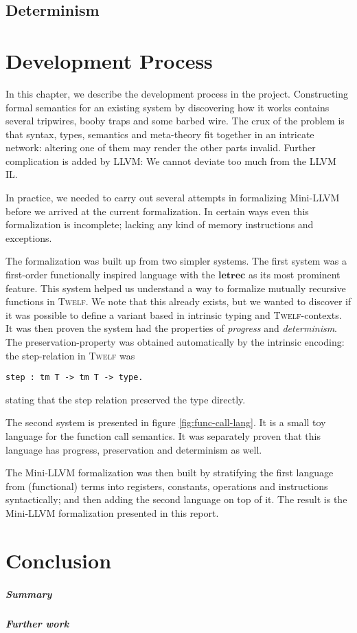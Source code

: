\documentclass[a4paper, oneside, 10pt, draft]{memoir}
\newcommand{\twelf}{\textsc{Twelf}}
\begin{document}
\section{Determinism}
\chapter{Development Process}

In this chapter, we describe the development process in the
project. Constructing formal semantics for an existing system by
discovering how it works contains several tripwires, booby traps and
some barbed wire. The crux of the problem is that syntax, types,
semantics and meta-theory fit together in an intricate network:
altering one of them may render the other parts invalid. Further
complication is added by LLVM: We cannot deviate too much from the
LLVM IL.

In practice, we needed to carry out several attempts in formalizing
Mini-LLVM before we arrived at the current formalization. In certain
ways even this formalization is incomplete; lacking any kind of memory
instructions and exceptions.

The formalization was built up from two simpler systems. The first
system was a first-order functionally inspired language with the
$\mathbf{letrec}$ as its most prominent feature. This system helped us
understand a way to formalize mutually recursive functions in
\twelf{}. We note that this already
exists\cite{twelfwiki:2007:mutually-recursive}, but we wanted to
discover if it was possible to define a variant based in intrinsic
typing and \twelf{}-contexts. It was then proven the system had the
properties of \emph{progress} and \emph{determinism}. The
preservation-property was obtained automatically by the intrinsic
encoding: the step-relation in \twelf{} was
\begin{verbatim}
step : tm T -> tm T -> type.
\end{verbatim}
stating that the step relation preserved the type directly.

The second system is presented in figure \ref{fig:func-call-lang}. It
is a small toy language for the function call semantics. It was
separately proven that this language has progress, preservation and
determinism as well.

The Mini-LLVM formalization was then built by stratifying the first
language from (functional) terms into registers, constants, operations
and instructions syntactically; and then adding the second language on
top of it. The result is the Mini-LLVM formalization presented in this
report.

\chapter{Conclusion}

\paragraph{Summary}
\paragraph{Further work}



\end{document}
